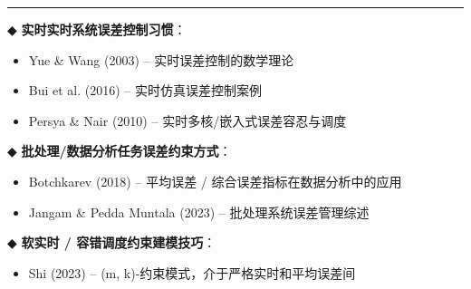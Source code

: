 \documentclass[
]{article}
\begin{document}
\begin{center}\rule{0.5\linewidth}{0.5pt}\end{center}

◆ \textbf{实时实时系统误差控制习惯}：

\begin{itemize}
\item
  Yue \& Wang (2003) -- 实时误差控制的数学理论
\item
  Bui et al. (2016) -- 实时仿真误差控制案例
\item
  Persya \& Nair (2010) -- 实时多核/嵌入式误差容忍与调度
\end{itemize}

◆ \textbf{批处理/数据分析任务误差约束方式}：

\begin{itemize}
\item
  Botchkarev (2018) -- 平均误差 / 综合误差指标在数据分析中的应用
\item
  Jangam \& Pedda Muntala (2023) -- 批处理系统误差管理综述
\end{itemize}

◆ \textbf{软实时 / 容错调度约束建模技巧}：

\begin{itemize}
\item
  Shi (2023) -- (m, k)-约束模式，介于严格实时和平均误差间
\end{itemize}
\end{document}
